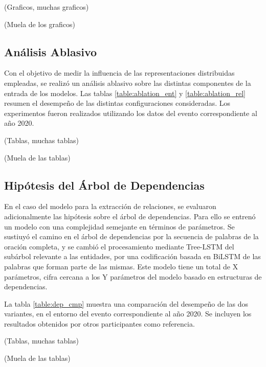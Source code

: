 (Graficos, muchas graficos)

(Muela de los graficos)

\subsection{Análisis Ablasivo}

Con el objetivo de medir la influencia de las representaciones distribuidas empleadas, se realizó un análisis ablasivo sobre las distintas componentes de la entrada de los modelos.
Las tablas \ref{table:ablation_ent} y \ref{table:ablation_rel} resumen el desempeño de las distintas configuraciones consideradas.
Los experimentos fueron realizados utilizando los datos del evento correspondiente al año 2020.

(Tablas, muchas tablas)

(Muela de las tablas)

\subsection{Hipótesis del Árbol de Dependencias}

En el caso del modelo para la extracción de relaciones, se evaluaron adicionalmente las hipótesis sobre el árbol de dependencias.
Para ello se entrenó un modelo con una complejidad semejante en términos de parámetros.
Se sustiuyó el camino en el árbol de dependencias por la secuencia de palabras de la oración completa, y se cambió el procesamiento mediante Tree-LSTM del subárbol relevante a las entidades, por una codificación basada en BiLSTM de las palabras que forman parte de las mismas.
Este modelo tiene un total de X parámetros, cifra cercana a los Y parámetros del modelo basado en estructuras de dependencias.

La tabla \ref{table:dep_cmp} muestra una comparación del desempeño de las dos variantes, en el entorno del evento correspondiente al año 2020. Se incluyen los resultados obtenidos por otros participantes como referencia.

(Tablas, muchas tablas)

(Muela de las tablas)


